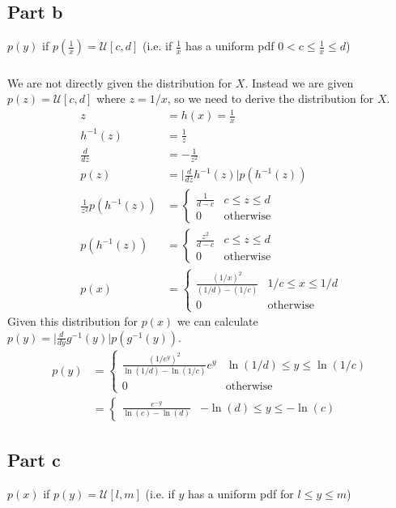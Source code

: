 \documentclass[11pt]{article}
\begin{document}
\subsection*{Part b}
$p(y)$ if $p(\frac{1}{x})=\mathcal{U}[c,d]$ (i.e. if $\frac{1}{x}$ has a uniform pdf $0<c\leq \frac{1}{x} \leq d$)

\subparagraph*{}
We are not directly given the distribution for $X$. Instead we are given $p(z)=\mathcal{U}[c,d]$ where $z=1/x$, so we need to derive the distribution for $X$.
\begin{align*}
	z &= h(x) = \frac{1}{x}\\
	h^{-1}(z) &= \frac{1}{z}\\
	\frac{d}{dz} &= -\frac{1}{z^2} \\
	p(z) &= \Big|\frac{d}{dz}h^{-1}(z)\Big|p(h^{-1}(z)) \\
	\frac{1}{z^2}p(h^{-1}(z)) &= \begin{cases} \frac{1}{d-c} & c\leq z \leq d \\ 0 & \text{otherwise} \end{cases} \\
	p(h^{-1}(z)) &= \begin{cases} \frac{z^2}{d-c} & c\leq z \leq d \\ 0 & \text{otherwise} \end{cases} \\
	p(x) &= \begin{cases} \frac{(1/x)^2}{(1/d)-(1/c)} & 1/c \leq x \leq 1/d \\ 0 & \text{otherwise} \end{cases}
\end{align*}
Given this distribution for $p(x)$ we can calculate $p(y)=\Big|\frac{d}{dy}g^{-1}(y)\Big|p(g^{-1}(y))$.
\begin{align*}
	p(y) &= \begin{cases} \frac{(1/e^y)^2}{\ln(1/d)-\ln(1/c)}e^y & \ln(1/d)\leq y \leq \ln(1/c) \\ 0 & \text{otherwise} \end{cases} \\
	&= \begin{cases} \frac{e^{-y}}{\ln(c)-\ln(d)} & -\ln(d) \leq y \leq -\ln(c) \end{cases}
\end{align*}

\subsection*{Part c}
$p(x)$ if $p(y) = \mathcal{U}[l,m]$ (i.e. if $y$ has a uniform pdf for $l\leq y \leq m$)
\end{document}
